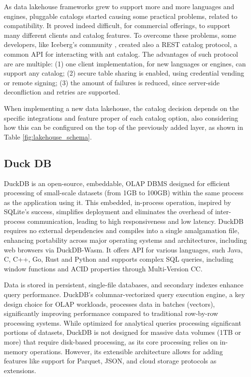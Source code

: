 As data lakehouse frameworks grew to support more and more languages and engines, pluggable catalogs started causing some practical problems, related to compatibility. It proved indeed difficult, for commercial offerings, to support many different clients and catalog features. To overcome these problems, some developers, like Iceberg's community \cite{blueCatalogsRESTCatalog2024}, created also a REST catalog protocol, a common \gls{API} for interacting with ant catalog. The advantages of such protocol are are multiple: (1) one client implementation, for new languages or engines, can support any catalog; (2) secure table sharing is enabled, using credential vending or remote signing; (3) the amount of failures is reduced, since server-side deconfliction and retries are supported.

When implementing a new data lakehouse, the catalog decision depends on the specific integrations and feature proper of each catalog option, also considering how this can be configured on the top of the previously added layer, as shown in Table \ref{fig:lakehouse_schema}.

\subsection{Duck DB}
DuckDB \cite{raasveldtDuckDBEmbeddableAnalytical2019} is an open-source, embeddable, \gls{OLAP} \gls{DBMS} designed for efficient processing of small-scale datasets (from 1GB to 100GB) within the same process as the application using it.  This embedded, in-process operation, inspired by SQLite's success, simplifies deployment and eliminates the overhead of inter-process communication, leading to high responsiveness and low latency.  DuckDB requires no external dependencies and compiles into a single amalgamation file, enhancing portability across major operating systems and architectures, including web browsers via DuckDB-Wasm.  It offers \gls{API} for various languages, such Java, C, C++, Go, Rust and Python and supports complex \gls{SQL} queries, including window functions and \gls{ACID} properties through Multi-Version \gls{CC}.  

Data is stored in persistent, single-file databases, and secondary indexes enhance query performance.  DuckDB's columnar-vectorized query execution engine, a key design choice for \gls{OLAP} workloads, processes data in batches (vectors), significantly improving performance compared to traditional row-by-row processing systems.  While optimized for analytical queries processing significant portions of datasets, DuckDB is not designed for massive data volumes (1TB or more) that require disk-based processing, as its core processing relies on in-memory operations.  However, its extensible architecture allows for adding features like support for Parquet, JSON, and cloud storage protocols as extensions.

